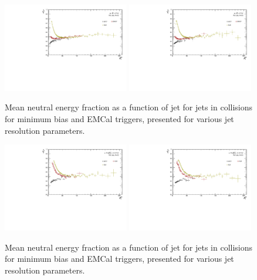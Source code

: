 \begin{figure}[hbt!]
    \centering
    \includegraphics[width=0.49\textwidth]{figures/TriggerBias/NEF/All/mean_NEF_R02.pdf}
    \includegraphics[width=0.49\textwidth]{figures/TriggerBias/NEF/All/mean_NEF_R05.pdf}
    \caption{Mean neutral energy fraction as a function of jet \pT for jets in \pp collisions for minimum bias and EMCal triggers, presented for various jet resolution parameters.}
    \label{fig:meanNEF_pp}
\end{figure}

\begin{figure}[hbt!]
    \centering
    \includegraphics[width=0.49\textwidth]{figures/pPbFigures/TriggerBias/NEF/All/mean_NEF_R02.pdf}
    \includegraphics[width=0.49\textwidth]{figures/pPbFigures/TriggerBias/NEF/All/mean_NEF_R04.pdf}
    \caption{Mean neutral energy fraction as a function of jet \pT for jets in \pPb collisions for minimum bias and EMCal triggers, presented for various jet resolution parameters.}
    \label{fig:meanNEF_pPb}
\end{figure}

